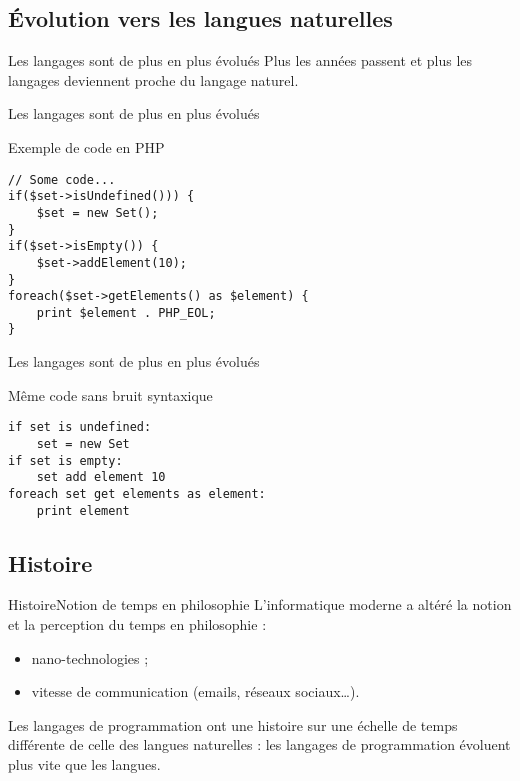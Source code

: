 \documentclass[notes]{beamer}
\begin{document}
\subsection{Évolution vers les langues naturelles}

\begin{frame}[fragile]{Les langages sont de plus en plus évolués}
    \pause
    Plus les années passent et plus les langages deviennent \alert{proche} du langage naturel.
\end{frame}

\begin{frame}[fragile]{Les langages sont de plus en plus évolués}
    \begin{exampleblock}{Exemple de code en PHP}
\lstset{ %
language=PHP,                %
basicstyle=\scriptsize,       %
}
\begin{lstlisting}
// Some code...
if($set->isUndefined())) {
    $set = new Set();
}
if($set->isEmpty()) {
    $set->addElement(10);
}
foreach($set->getElements() as $element) {
    print $element . PHP_EOL;
}
\end{lstlisting}
    \end{exampleblock}
\end{frame}

\begin{frame}[fragile]{Les langages sont de plus en plus évolués}
    \begin{exampleblock}{Même code sans bruit syntaxique}
    \pause
\begin{verbatim}
if set is undefined:
    set = new Set
if set is empty:
    set add element 10
foreach set get elements as element:
    print element
\end{verbatim}
    \end{exampleblock}
\end{frame}

\subsection{Histoire}

\begin{frame}{Histoire}{Notion de temps en philosophie}
\pause
L'informatique moderne a altéré la notion et la perception du temps en philosophie :
\pause
\begin{itemize}[<+->]
\item nano-technologies ;
\item vitesse de communication (emails, réseaux sociaux…).
\end{itemize}
\pause
Les langages de programmation ont une \alert{histoire} sur une échelle de temps différente de
celle des langues naturelles : \pause les langages de programmation évoluent plus vite que les langues.
\end{frame}
\end{document}

